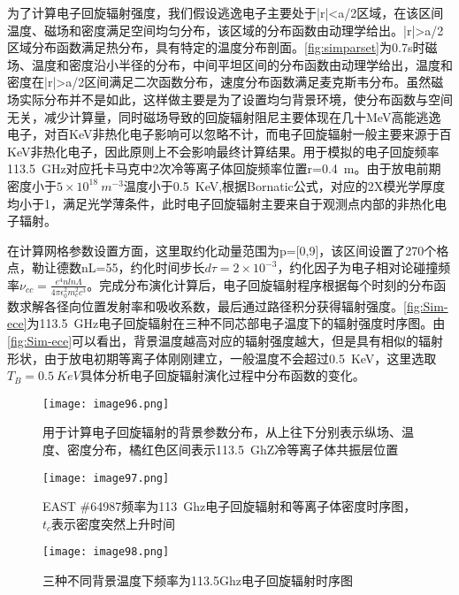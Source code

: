 为了计算电子回旋辐射强度，我们假设逃逸电子主要处于|r|<a/2区域，在该区间温度、磁场和密度满足空间均匀分布，该区域的分布函数由动理学给出。|r|>a/2区域分布函数满足热分布，具有特定的温度分布剖面。\autoref{fig:simparset}为0.7s时磁场、温度和密度沿小半径的分布，中间平坦区间的分布函数由动理学给出，温度和密度在|r|>a/2区间满足二次函数分布，速度分布函数满足麦克斯韦分布。虽然磁场实际分布并不是如此，这样做主要是为了设置均匀背景环境，使分布函数与空间无关，减少计算量，同时磁场导致的回旋辐射阻尼主要体现在几十MeV高能逃逸电子，对百KeV非热化电子影响可以忽略不计，而电子回旋辐射一般主要来源于百KeV非热化电子，因此原则上不会影响最终计算结果。用于模拟的电子回旋频率113.5~GHz对应托卡马克中2次冷等离子体回旋频率位置r=0.4~m。由于放电前期密度小于$5×10^{18}~m^{-3}$温度小于0.5~KeV,根据Bornatic公式\cite{RN351}，对应的2X模光学厚度均小于1，满足光学薄条件，此时电子回旋辐射主要来自于观测点内部的非热化电子辐射。


在计算网格参数设置方面，这里取约化动量范围为p=[0,9]，该区间设置了270个格点，勒让德数nL=55，约化时间步长$dτ=2×10^{-3}$，约化因子为电子相对论碰撞频率$ν_{cc}=\frac{e^4 nlnΛ}{4πϵ_0^2 m_e^2 c^3 }$。完成分布演化计算后，电子回旋辐射程序根据每个时刻的分布函数求解各径向位置发射率和吸收系数，最后通过路径积分获得辐射强度。\autoref{fig:Sim-ece}为113.5~GHz电子回旋辐射在三种不同芯部电子温度下的辐射强度时序图。由\autoref{fig:Sim-ece}可以看出，背景温度越高对应的辐射强度越大，但是具有相似的辐射形状，由于放电初期等离子体刚刚建立，一般温度不会超过0.5~KeV，这里选取$T_B=0.5~KeV$具体分析电子回旋辐射演化过程中分布函数的变化。
\begin{figure}[H]
\centering
\texttt{[image: image96.png]}
\caption{\label{fig:simparset}用于计算电子回旋辐射的背景参数分布，从上往下分别表示纵场、温度、密度分布，橘红色区间表示113.5~GhZ冷等离子体共振层位置}
\end{figure}

\begin{figure}[H]
\centering
\texttt{[image: image97.png]}
\caption{\label{fig:Expne-ece}EAST \#64987频率为113~Ghz电子回旋辐射和等离子体密度时序图，$t_c$表示密度突然上升时间}
\end{figure}

\begin{figure}
\centering
\texttt{[image: image98.png]}
\caption{\label{fig:Sim-ece} 三种不同背景温度下频率为113.5Ghz电子回旋辐射时序图}
\end{figure}
